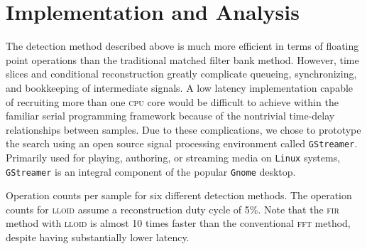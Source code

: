\section{Implementation and Analysis}
\label{SECIII}\label{sec:analysis}

 The detection method described above is much more efficient in terms of floating point operations than the traditional matched filter bank method.  However, time slices and conditional reconstruction greatly complicate queueing, synchronizing, and bookkeeping of intermediate signals.  A low latency implementation capable of recruiting more than one \textsc{cpu} core would be difficult to achieve within the familiar serial programming framework because of the nontrivial time-delay relationships between samples.  Due to these complications, we chose to prototype the search using an open source signal processing environment called \texttt{GStreamer}.    Primarily used for playing, authoring, or streaming media on \texttt{Linux} systems, \texttt{GStreamer} is an integral component of the popular \texttt{Gnome} desktop.


\begin{table}[!h]
\caption{Operation counts per sample for six different detection methods.  The operation counts for \textsc{lloid} assume a reconstruction duty cycle of 5\%.  Note that the \textsc{fir} method with \textsc{lloid} is almost 10 times faster than the conventional \textsc{fft} method, despite having substantially lower latency.}
\begin{center}

\end{center}
\end{table}


\begin{comment}


\begin{figure*}[h!]
\begin{center}
\texttt{[image: figures/flow\_chart.pdf]}
\caption{\label{f:flowchart} 
}
\end{center}
\end{figure*}

\end{comment}
